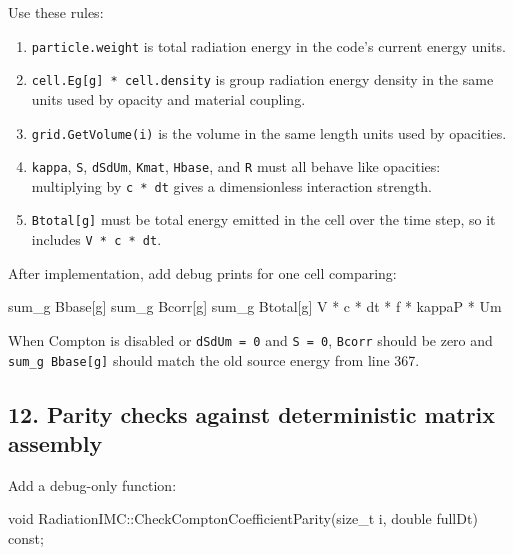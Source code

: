 \documentclass[
]{article}
\newenvironment{Shaded}{}{}
\newcommand{\AttributeTok}[1]{\textcolor[rgb]{0.49,0.56,0.16}{#1}}
\newcommand{\DataTypeTok}[1]{\textcolor[rgb]{0.56,0.13,0.00}{#1}}
\newcommand{\NormalTok}[1]{#1}
\newcommand{\OperatorTok}[1]{\textcolor[rgb]{0.40,0.40,0.40}{#1}}
\providecommand{\tightlist}{%
  \setlength{\itemsep}{0pt}\setlength{\parskip}{0pt}}
\begin{document}
Use these rules:

\begin{enumerate}
\def\labelenumi{\arabic{enumi}.}
\tightlist
\item
  \texttt{particle.weight} is total radiation energy in the code's
  current energy units.
\item
  \texttt{cell.Eg{[}g{]}\ *\ cell.density} is group radiation energy
  density in the same units used by opacity and material coupling.
\item
  \texttt{grid.GetVolume(i)} is the volume in the same length units used
  by opacities.
\item
  \texttt{kappa}, \texttt{S}, \texttt{dSdUm}, \texttt{Kmat},
  \texttt{Hbase}, and \texttt{R} must all behave like opacities:
  multiplying by \texttt{c\ *\ dt} gives a dimensionless interaction
  strength.
\item
  \texttt{Btotal{[}g{]}} must be total energy emitted in the cell over
  the time step, so it includes \texttt{V\ *\ c\ *\ dt}.
\end{enumerate}

After implementation, add debug prints for one cell comparing:

\begin{Shaded}
\begin{Highlighting}[]
\NormalTok{sum\_g Bbase}\OperatorTok{[}\NormalTok{g}\OperatorTok{]}
\NormalTok{sum\_g Bcorr}\OperatorTok{[}\NormalTok{g}\OperatorTok{]}
\NormalTok{sum\_g Btotal}\OperatorTok{[}\NormalTok{g}\OperatorTok{]}
\NormalTok{V }\OperatorTok{*}\NormalTok{ c }\OperatorTok{*}\NormalTok{ dt }\OperatorTok{*}\NormalTok{ f }\OperatorTok{*}\NormalTok{ kappaP }\OperatorTok{*}\NormalTok{ Um}
\end{Highlighting}
\end{Shaded}

When Compton is disabled or \texttt{dSdUm\ =\ 0} and \texttt{S\ =\ 0},
\texttt{Bcorr} should be zero and \texttt{sum\_g\ Bbase{[}g{]}} should
match the old source energy from line 367.

\subsection{12. Parity checks against deterministic matrix
assembly}\label{parity-checks-against-deterministic-matrix-assembly}

Add a debug-only function:

\begin{Shaded}
\begin{Highlighting}[]
\DataTypeTok{void}\NormalTok{ RadiationIMC}\OperatorTok{::}\NormalTok{CheckComptonCoefficientParity}\OperatorTok{(}\DataTypeTok{size\_t}\NormalTok{ i}\OperatorTok{,} \DataTypeTok{double}\NormalTok{ fullDt}\OperatorTok{)} \AttributeTok{const}\OperatorTok{;}
\end{Highlighting}
\end{Shaded}
\end{document}
